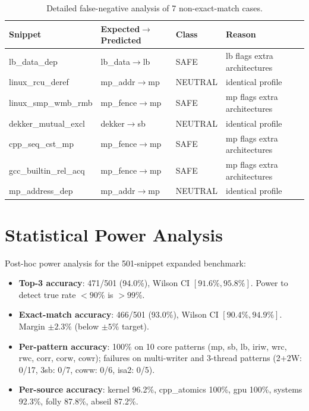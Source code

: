 \documentclass[11pt]{article}
\begin{document}
\begin{longtable}{lllp{5cm}}
\caption{Detailed false-negative analysis of 7 non-exact-match cases.} \\
\toprule
\textbf{Snippet} & \textbf{Expected$\to$Predicted} & \textbf{Class} & \textbf{Reason} \\
\midrule
\endfirsthead
\endhead
\bottomrule
\endfoot
lb\_data\_dep & lb\_data$\to$lb & SAFE & lb flags extra architectures \\
linux\_rcu\_deref & mp\_addr$\to$mp & NEUTRAL & identical profile \\
linux\_smp\_wmb\_rmb & mp\_fence$\to$mp & SAFE & mp flags extra architectures \\
dekker\_mutual\_excl & dekker$\to$sb & NEUTRAL & identical profile \\
cpp\_seq\_cst\_mp & mp\_fence$\to$mp & SAFE & mp flags extra architectures \\
gcc\_builtin\_rel\_acq & mp\_fence$\to$mp & SAFE & mp flags extra architectures \\
mp\_address\_dep & mp\_addr$\to$mp & NEUTRAL & identical profile \\
\end{longtable}

\section{Statistical Power Analysis}
\label{app:power-analysis}

Post-hoc power analysis for the 501-snippet expanded benchmark:
\begin{itemize}[nosep]
\item \textbf{Top-3 accuracy}: 471/501 (94.0\%), Wilson CI $[91.6\%, 95.8\%]$.
  Power to detect true rate $<90\%$ is $>99\%$.
\item \textbf{Exact-match accuracy}: 466/501 (93.0\%), Wilson CI $[90.4\%, 94.9\%]$.
  Margin $\pm 2.3\%$ (below $\pm 5\%$ target).
\item \textbf{Per-pattern accuracy}: 100\% on 10 core patterns (mp, sb, lb,
  iriw, wrc, rwc, corr, corw, cowr); failures on multi-writer and 3-thread
  patterns (2+2W: 0/17, 3sb: 0/7, coww: 0/6, isa2: 0/5).
\item \textbf{Per-source accuracy}: kernel 96.2\%, cpp\_atomics 100\%,
  gpu 100\%, systems 92.3\%, folly 87.8\%, abseil 87.2\%.
\end{itemize}

\end{document}
